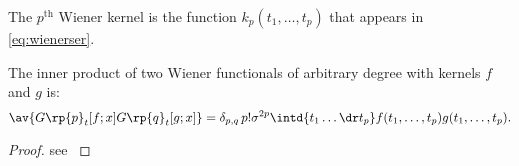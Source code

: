 \documentclass[12pt]{article}
\begin{document}
\begin{defn}
  The $p^{\text{th}}$ Wiener kernel is the function $k_p(t_1,\ldots,t_p)$ that appears in \eqref{eq:wienerser}.
\end{defn}

\begin{thm}
  The inner product of two Wiener functionals of arbitrary degree with kernels $f$ and $g$ is:
  \begin{equation}\label{eq:wienerinner}
    \av{G\rp{p}_t[f;x] G\rp{q}_t[g;x]} = \delta_{p,q}\, p! \sigma^{2p} \intd{t_1\ldots \dr t_p} f(t_1,\ldots,t_p) g(t_1,\ldots,t_p).
  \end{equation}
\end{thm}
\begin{proof}
  see \cite[\S14.2]{schetzen:1980}
\end{proof}
\end{document}
